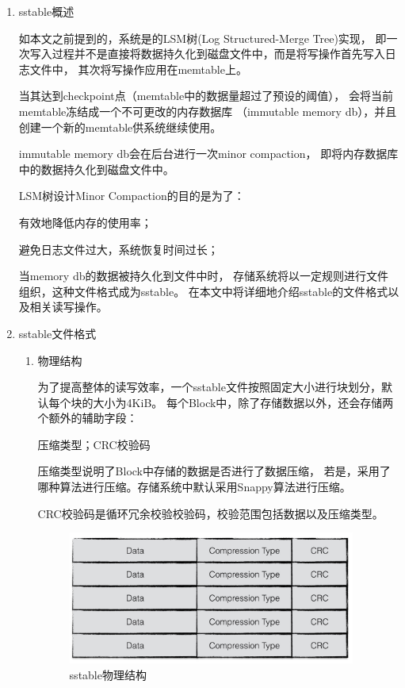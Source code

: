 			\begin{enumerate}
				\item sstable概述
				
				如本文之前提到的，系统是的LSM树(Log Structured-Merge Tree)实现，
				即一次写入过程并不是直接将数据持久化到磁盘文件中，而是将写操作首先写入日志文件中，
				其次将写操作应用在memtable上。

				当其达到checkpoint点（memtable中的数据量超过了预设的阈值），
				会将当前memtable冻结成一个不可更改的内存数据库
				（immutable memory db），并且创建一个新的memtable供系统继续使用。

				immutable memory db会在后台进行一次minor compaction，
				即将内存数据库中的数据持久化到磁盘文件中。

				LSM树设计Minor Compaction的目的是为了：

				有效地降低内存的使用率；
				
				避免日志文件过大，系统恢复时间过长；
				
				当memory db的数据被持久化到文件中时，
				存储系统将以一定规则进行文件组织，这种文件格式成为sstable。
				在本文中将详细地介绍sstable的文件格式以及相关读写操作。

				\item sstable文件格式
				

				\begin{enumerate}
					\item 物理结构

					为了提高整体的读写效率，一个sstable文件按照固定大小进行块划分，默认每个块的大小为4KiB。
					每个Block中，除了存储数据以外，还会存储两个额外的辅助字段：
	
					压缩类型；CRC校验码
	
					压缩类型说明了Block中存储的数据是否进行了数据压缩，
					若是，采用了哪种算法进行压缩。存储系统中默认采用Snappy算法进行压缩。
	
					CRC校验码是循环冗余校验校验码，校验范围包括数据以及压缩类型。
					
					\begin{figure}[H]
						\centering
						\includegraphics[width=0.95\textwidth]{images/sstable_physic.jpeg}
						\caption{sstable物理结构}
						\label{sstable_physic}
					\end{figure}
					

\end{enumerate}
\end{enumerate}
